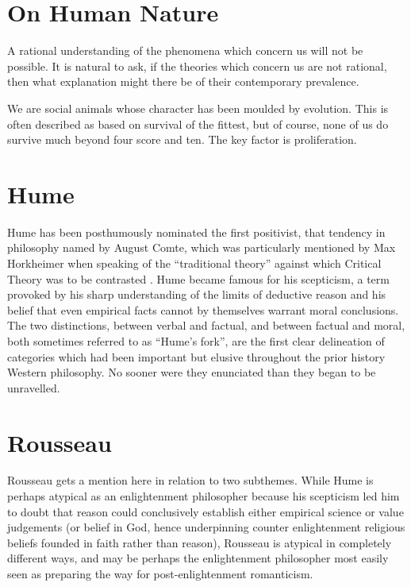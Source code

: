 \documentclass[10pt,titlepage]{article}
\begin{document}
\section{On Human Nature}

A rational understanding of the phenomena which concern us will not be possible.
It is natural to ask, if the theories which concern us are not rational, then what explanation might there be of their contemporary prevalence.

We are social animals whose character has been moulded by evolution.
This is often described as based on survival of the fittest, but of course, none of us do survive much beyond four score and ten.
The key factor is proliferation.


\section{Hume}

Hume has been posthumously nominated the first positivist, that tendency in philosophy named by August Comte, which was particularly mentioned by Max Horkheimer when speaking of the ``traditional theory'' against which Critical Theory was to be contrasted \cite{horkheimer-trad}.
Hume became famous for his scepticism, a term provoked by his sharp understanding of the limits of deductive reason and his belief that even empirical facts cannot by themselves warrant moral conclusions.
The two distinctions, between verbal and factual, and between factual and moral, both sometimes referred to as ``Hume's fork'', are the first clear delineation of categories which had been important but elusive throughout the prior history Western philosophy.
No sooner were they enunciated than they began to be unravelled.

\section{Rousseau}

Rousseau gets a mention here in relation to two subthemes.
While Hume is perhaps atypical as an enlightenment philosopher because his scepticism led him to doubt that reason could conclusively establish either empirical science or value judgements (or belief in God, hence underpinning counter enlightenment religious beliefs founded in faith rather than reason), Rousseau is atypical in completely different ways, and may be perhaps the enlightenment philosopher most easily seen as preparing the way for post-enlightenment romanticism.\cite{berlinRR}
\end{document}
